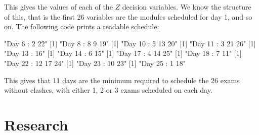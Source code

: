 This gives the values of each of the $Z$ decision variables.
We know the structure of this, that is the first 26 variables are the modules scheduled for day 1, and so on.
The following code prints a readable schedule:


\begin{Rout}
[1] "Day 6 : 2 22"
[1] "Day 8 : 8 9 19"
[1] "Day 10 : 5 13 20"
[1] "Day 11 : 3 21 26"
[1] "Day 13 : 16"
[1] "Day 14 : 6 15"
[1] "Day 17 : 4 14 25"
[1] "Day 18 : 7 11"
[1] "Day 22 : 12 17 24"
[1] "Day 23 : 10 23"
[1] "Day 25 : 1 18"
\end{Rout}

This gives that 11 days are the minimum required to schedule the 26 exams without clashes, with either 1, 2 or 3 exams scheduled on each day.

\section{Research}\label{sec:research}
